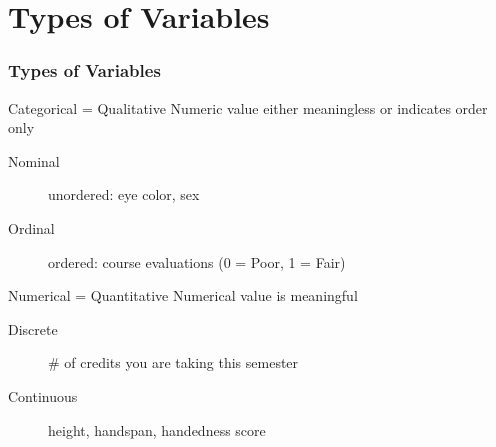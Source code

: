 \section{Types of Variables}
%
%

\begin{frame}
\frametitle{Types of Variables}
\begin{block}{Categorical = Qualitative}
Numeric value either meaningless or indicates order only 
		\begin{description}
			\item[Nominal] unordered: eye color, sex 
			\item[Ordinal] ordered: course evaluations (0 = Poor, 1 = Fair) 
		\end{description}
\end{block}
\pause
\begin{block}{Numerical = Quantitative}
Numerical value is meaningful
		\begin{description}
			\item[Discrete] \# of credits you are taking this semester 
      \item[Continuous] height, handspan, handedness score
		\end{description}
\end{block}

\end{frame}

